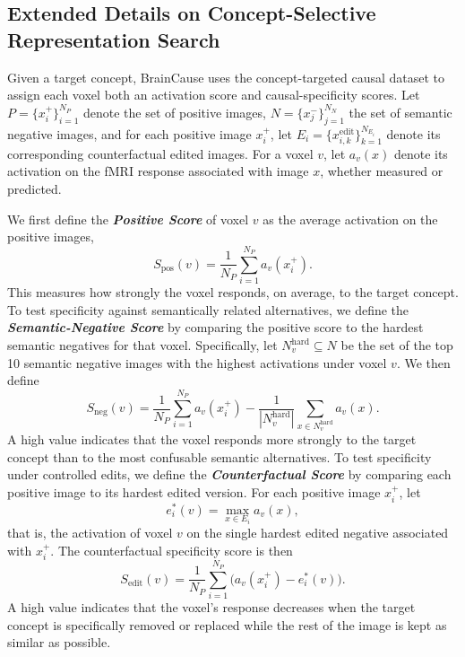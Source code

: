 \documentclass{article}
\begin{document}
\subsection{Extended Details on Concept-Selective Representation Search}
\label{sec_sup:Search}

Given a target concept, BrainCause uses the concept-targeted causal dataset to assign each voxel both an activation score and causal-specificity scores. Let \(P=\{x_i^{+}\}_{i=1}^{N_{P}}\) denote the set of positive images, \(N=\{x_j^{-}\}_{j=1}^{N_{N}}\) the set of semantic negative images, and for each positive image \(x_i^{+}\), let \(E_i=\{x_{i,k}^{\mathrm{edit}}\}_{k=1}^{N_{E_i}}\) denote its corresponding counterfactual edited images. For a voxel \(v\), let \(a_v(x)\) denote its activation on the fMRI response associated with image \(x\), whether measured or predicted.

We first define the \emph{\textbf{Positive Score}} of voxel \(v\) as the average activation on the positive images,
\[
S_{\mathrm{pos}}(v)=\frac{1}{N_P}\sum_{i=1}^{N_P} a_v(x_i^{+}).
\]
This measures how strongly the voxel responds, on average, to the target concept. To test specificity against semantically related alternatives, we define the \emph{\textbf{Semantic-Negative Score}} by comparing the positive score to the hardest semantic negatives for that voxel. Specifically, let \(N_v^{\mathrm{hard}}\subseteq N\) be the set of the top 10 semantic negative images with the highest activations under voxel \(v\). We then define
\[
S_{\mathrm{neg}}(v)=
\frac{1}{N_P}\sum_{i=1}^{N_P} a_v(x_i^{+})
-
\frac{1}{|N_v^{\mathrm{hard}}|}\sum_{x\in N_v^{\mathrm{hard}}} a_v(x).
\]
A high value indicates that the voxel responds more strongly to the target concept than to the most confusable semantic alternatives. To test specificity under controlled edits, we define the \emph{\textbf{Counterfactual Score}} by comparing each positive image to its hardest edited version. For each positive image \(x_i^{+}\), let
\[
e_i^*(v)=\max_{x\in E_i} a_v(x),
\]
that is, the activation of voxel \(v\) on the single hardest edited negative associated with \(x_i^{+}\). The counterfactual specificity score is then
\[
S_{\mathrm{edit}}(v)=
\frac{1}{N_P}\sum_{i=1}^{N_P}\Big(a_v(x_i^{+})-e_i^*(v)\Big).
\]
A high value indicates that the voxel's response decreases when the target concept is specifically removed or replaced while the rest of the image is kept as similar as possible.
\end{document}
